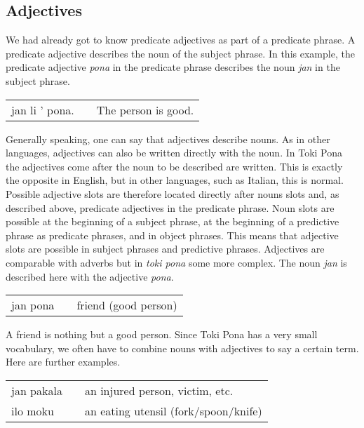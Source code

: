 \subsection*{Adjectives}

We had already got to know predicate adjectives as part of a predicate phrase. 
A predicate adjective describes the noun of the subject phrase.
In this example, the predicate adjective \textit{pona} in the predicate phrase describes the noun \textit{jan} in the subject phrase.

\begin{supertabular}{p{5,5cm}|ll}
jan li ' pona. &&  The person is good. \\
\end{supertabular} 

Generally speaking, one can say that adjectives describe nouns. 
As in other languages, adjectives can also be written directly with the noun. 
In Toki Pona the adjectives come after the noun to be described are written. 
This is exactly the opposite in English, but in other languages, such as Italian, this is normal.
Possible adjective slots are therefore located directly after nouns slots and, as described above, predicate adjectives in the predicate phrase. 
Noun slots are possible at the beginning of a subject phrase, at the beginning of a predictive phrase as predicate phrases, and in object phrases. 
This means that adjective slots are possible in subject phrases and predictive phrases.
Adjectives are comparable with adverbs but in \textit{toki pona} some more complex.
The noun \textit{jan} is described here with the adjective \textit{pona}.

\begin{supertabular}{p{5,5cm}|ll}
jan pona && friend (good person) \\
\end{supertabular} 

A friend is nothing but a good person.
Since Toki Pona has a very small vocabulary, we often have to combine nouns with adjectives to say a certain term. 
Here are further examples. 

\begin{supertabular}{p{5,5cm}|ll}
jan pakala && an injured person, victim, etc. \\
ilo moku && an eating utensil (fork/spoon/knife) \\
\end{supertabular} 

